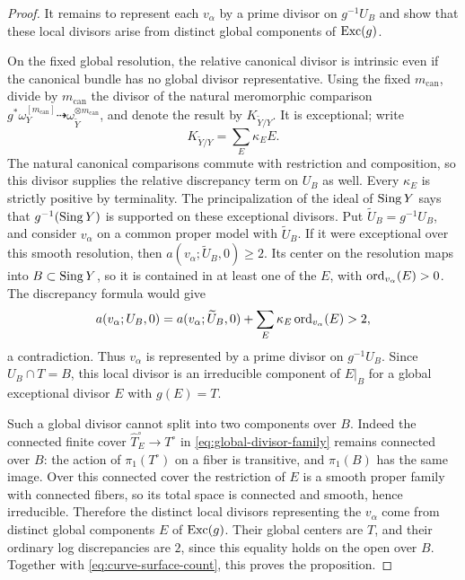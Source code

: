\begin{proof}
It remains to represent each \(v_\alpha\) by a prime divisor on
\(g^{-1}U_B\) and show that these local divisors arise from distinct
global components of \(\operatorname{Exc}(g)\).

On the fixed global resolution, the relative canonical divisor is
intrinsic even if the canonical bundle has no global divisor
representative.  Using the fixed \(m_{\mathrm{can}}\), divide by
\(m_{\mathrm{can}}\) the divisor of the
natural meromorphic comparison
\(g^*\omega_Y^{[m_{\mathrm{can}}]}\dashrightarrow
\omega_{\widetilde Y}^{\otimes m_{\mathrm{can}}}\), and denote the
result by \(K_{\widetilde Y/Y}\).  It is exceptional; write
\[
 K_{\widetilde Y/Y}=\sum_E\kappa_EE.
\]
The natural canonical comparisons commute with restriction and
composition, so this divisor supplies the relative discrepancy term
on \(U_B\) as well.
Every \(\kappa_E\) is strictly positive by terminality.  The
principalization of the ideal of \(\operatorname{Sing} Y\) says that
\(g^{-1}(\operatorname{Sing} Y)\) is supported on these exceptional divisors.
Put \(\widetilde U_B=g^{-1}U_B\), and consider \(v_\alpha\) on a
common proper model with \(\widetilde U_B\).  If it were exceptional
over this smooth resolution, then \(a(v_\alpha;\widetilde U_B,0)\ge2\).
Its center on the
resolution maps into \(B\subset\operatorname{Sing} Y\), so it is contained in at
least one of the \(E\), with \(\operatorname{ord}_{v_\alpha}(E)>0\).
The discrepancy formula would give
\[
 a(v_\alpha;U_B,0)
 =a(v_\alpha;\widetilde U_B,0)
    +\sum_E\kappa_E\operatorname{ord}_{v_\alpha}(E)>2,
\]
a contradiction.  Thus \(v_\alpha\) is represented by a prime
divisor on \(g^{-1}U_B\).  Since \(U_B\cap T=B\), this local divisor
is an irreducible component of \(E|_B\) for a global exceptional
divisor \(E\) with \(g(E)=T\).

Such a global divisor cannot split into two components over \(B\).
Indeed the connected finite cover \(\widehat T_E^\circ\to T^\circ\) in
\eqref{eq:global-divisor-family} remains connected over \(B\):
the action of \(\pi_1(T^\circ)\) on a fiber is transitive, and
\(\pi_1(B)\) has the same image.  Over this connected cover the
restriction of \(E\) is a smooth proper family with connected
fibers, so its total space is connected and smooth, hence
irreducible.  Therefore the distinct local divisors representing
the \(v_\alpha\) come from distinct global components \(E\) of
\(\operatorname{Exc}(g)\).  Their global centers are \(T\), and their ordinary
log discrepancies are \(2\), since this equality holds on the
open over \(B\).  Together with \eqref{eq:curve-surface-count},
this proves the proposition.
\end{proof}

